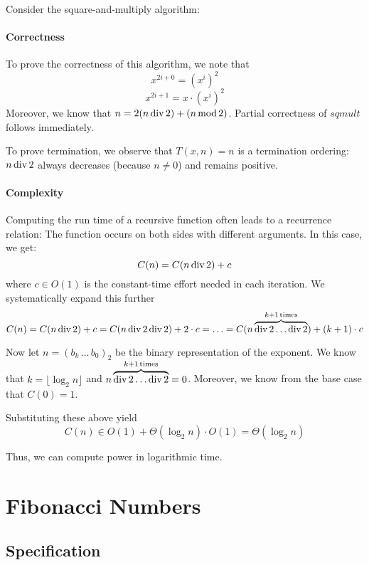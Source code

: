 Consider the square-and-multiply algorithm:
\begin{acode}
\end{acode}

\paragraph{Correctness}
To prove the correctness of this algorithm, we note that
\[x^{2i+0}=(x^i)^2\]
\[x^{2i+1}=x\cdot(x^i)^2\]
Moreover, we know that $n=2(n\mathop{\mathrm{div}} 2)+(n\mathop{\mathrm{mod}} 2)$.
Partial correctness of $sqmult$ follows immediately.

To prove termination, we observe that $T(x,n)=n$ is a termination ordering: $n\mathop{\mathrm{div}} 2$ always decreases (because $n\neq 0$) and remains positive.

\paragraph{Complexity}
Computing the run time of a recursive function often leads to a recurrence relation: The function occurs on both sides with different arguments.
In this case, we get:
 \[C(n)=C(n\mathop{\mathrm{div}} 2) + c\]
where $c\in O(1)$ is the constant-time effort needed in each iteration.
We systematically expand this further
 \[C(n)=C(n\mathop{\mathrm{div}} 2) + c = C(n\mathop{\mathrm{div}} 2\mathop{\mathrm{div}} 2) + 2\cdot c=\ldots=C(n\overbrace{\mathop{\mathrm{div}} 2\ldots\mathop{\mathrm{div}} 2}^{k+1\,\text{times}})+(k+1)\cdot c\]

Now let $n=(b_k\,\ldots\,b_0)_2$ be the binary representation of the exponent.
We know that $k=\lfloor\log_2 n\rfloor$ and $n\overbrace{\mathop{\mathrm{div}} 2\ldots\mathop{\mathrm{div}} 2}^{k+1\,\text{times}}=0$.
Moreover, we know from the base case that $C(0)=1$.

Substituting these above yield
\[C(n)\in O(1)+\Theta(\log_2 n)\cdot O(1)=\Theta(\log_2 n)\]

Thus, we can compute power in logarithmic time.

\section{Fibonacci Numbers}\label{sec:ad:fib}

\subsection{Specification}\label{sec:ad:fib:spec}

